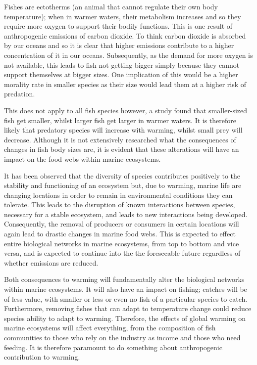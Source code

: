 \documentclass{article}
\begin{document}
Fishes are ectotherms (an animal that cannot regulate their own body temperature); when in warmer waters, their metabolism increases and so they require more oxygen to support their bodily functions. This is one result of anthropogenic emissions of carbon dioxide. To think carbon dioxide is absorbed by our oceans and so it is clear that higher emissions contribute to a higher concentration of it in our oceans. Subsequently, as the demand for more oxygen is not available, this leads to fish not getting bigger simply because they cannot support themselves at bigger sizes. One implication of this would be a higher morality rate in smaller species as their size would lead them at a higher risk of predation. 

This does not apply to all fish species however, a study found that smaller-sized fish get smaller, whilst larger fish get larger in warmer waters. It is therefore likely that predatory species will increase with warming, whilst small prey will decrease. Although it is not extensively researched what the consequences of changes in fish body sizes are, it is evident that these alterations will have an impact on the food webs within marine ecosystems.

It has been observed that the diversity of species contributes positively to the stability and functioning of an ecosystem but, due to warming, marine life are changing locations in order to remain in environmental conditions they can tolerate. This leads to the disruption of known interactions between species, necessary for a stable ecosystem, and leads to new interactions being developed. Consequently, the removal of producers or consumers in certain locations will again lead to drastic changes in marine food webs. This is expected to effect entire biological networks in marine ecosystems, from top to bottom and vice versa, and is expected to continue into the the foreseeable future regardless of whether emissions are reduced.

Both consequences to warming will fundamentally alter the biological networks within marine ecosystems. It will also have an impact on fishing; catches will be of less value, with smaller or less or even no fish of a particular species to catch. Furthermore, removing fishes that can adapt to temperature change could reduce species ability to adapt to warming. Therefore, the effects of global warming on marine ecosystems will affect everything, from the composition of fish communities to those who rely on the industry as income and those who need feeding. It is therefore paramount to do something about anthropogenic contribution to warming.  
\end{document}
